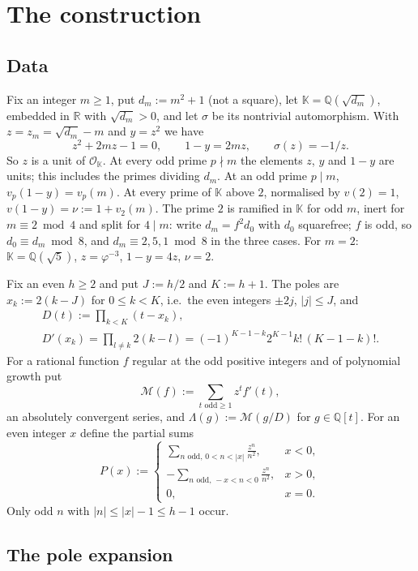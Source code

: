 \documentclass[11pt]{amsart}
\theoremstyle{definition}
\theoremstyle{remark}
\numberwithin{equation}{section}
\newcommand{\QQ}{\mathbb{Q}}
\newcommand{\RR}{\mathbb{R}}
\newcommand{\KK}{\mathbb{K}}
\newcommand{\cM}{\mathcal{M}}
\newcommand{\cO}{\mathcal{O}}
\begin{document}
\section{The construction}\label{sec:construction}

\subsection{Data}\label{sec:data}
Fix an integer $m\ge1$, put $d_m:=m^2+1$ (not a square), let $\KK=\QQ(\sqrt{d_m})$, embedded in $\RR$ with $\sqrt{d_m}>0$,
and let $\sigma$ be its nontrivial automorphism. With $z=z_m=\sqrt{d_m}-m$ and $y=z^2$ we have
\[
  z^2+2mz-1=0,\qquad 1-y=2mz,\qquad \sigma(z)=-1/z .
\]
So $z$ is a unit of $\cO_\KK$. At every odd prime $p\nmid m$ the elements $z$, $y$ and $1-y$ are units; this includes the
primes dividing $d_m$. At an odd prime $p\mid m$, $v_p(1-y)=v_p(m)$. At every prime of $\KK$ above $2$, normalised by
$v(2)=1$, $v(1-y)=\nu:=1+v_2(m)$. The prime $2$ is ramified in $\KK$ for odd $m$, inert for $m\equiv2\bmod4$ and split
for $4\mid m$: write $d_m=f^2d_0$ with $d_0$ squarefree; $f$ is odd, so $d_0\equiv d_m\bmod8$, and $d_m\equiv2,5,1\bmod8$
in the three cases. For $m=2$: $\KK=\QQ(\sqrt5)$, $z=\varphi^{-3}$, $1-y=4z$, $\nu=2$.

Fix an even $h\ge2$ and put $J:=h/2$ and $K:=h+1$. The poles are $x_k:=2(k-J)$ for $0\le k<K$, i.e.\ the even integers
$\pm2j$, $|j|\le J$, and
\begin{gather*}
  D(t):=\prod_{k<K}(t-x_k),\\
  D'(x_k)=\prod_{l\ne k}2(k-l)=(-1)^{K-1-k}2^{K-1}k!\,(K-1-k)! .
\end{gather*}
For a rational function $f$ regular at the odd positive integers and of polynomial growth put
\[
  \cM(f):=\sum_{t\text{ odd}\ge1}z^tf'(t),
\]
an absolutely convergent series, and $\Lambda(g):=\cM(g/D)$ for $g\in\QQ[t]$. For an even integer $x$ define the partial
sums
\[
  P(x):=\begin{cases}\displaystyle\sum_{n\text{ odd},\,0<n<|x|}\frac{z^n}{n^2},&x<0,\\[10pt]
  \displaystyle-\sum_{n\text{ odd},\,-x<n<0}\frac{z^n}{n^2},&x>0,\\[8pt] 0,&x=0.\end{cases}
\]
Only odd $n$ with $|n|\le|x|-1\le h-1$ occur.

\subsection{The pole expansion}
\end{document}

